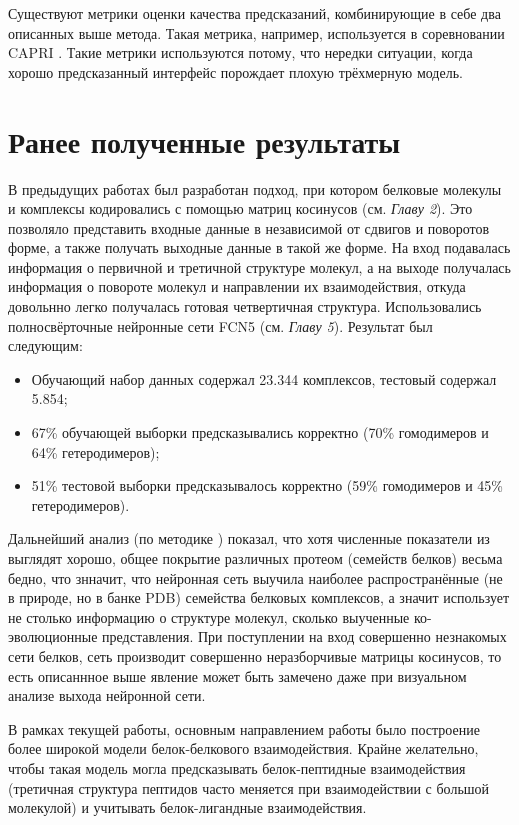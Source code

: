 Существуют метрики оценки качества предсказаний, комбинирующие в себе два описанных выше метода. Такая метрика, например, используется в соревновании CAPRI \cite{basu}. Такие метрики используются потому, что нередки ситуации, когда хорошо предсказанный интерфейс порождает плохую трёхмерную модель.

\section{Ранее полученные результаты}
В предыдущих работах \cite{prip2023} был разработан подход, при котором белковые молекулы и комплексы кодировались с помощью матриц косинусов (см. \textit{Главу 2}). Это позволяло представить входные данные в независимой от сдвигов и поворотов форме, а также получать выходные данные в такой же форме. На вход подавалась информация о первичной и третичной структуре молекул, а на выходе получалась информация о повороте молекул и направлении их взаимодействия, откуда довольнно легко получалась готовая четвертичная структура. Использовались полносвёрточные нейронные сети FCN5 (см. \textit{Главу 5}). Результат был следующим:
\begin{itemize}
\item Обучающий набор данных содержал 23.344 комплексов, тестовый содержал 5.854;
\item 67\% обучающей выборки предсказывались корректно (70\% гомодимеров и 64\% гетеродимеров);
\item 51\% тестовой выборки предсказывалось корректно (59\% гомодимеров и 45\% гетеродимеров).
\end{itemize}

Дальнейший анализ (по методике \cite{zhu}) показал, что хотя численные показатели из \cite{prip2023} выглядят хорошо, общее покрытие различных протеом (семейств белков) весьма бедно, что знначит, что нейронная сеть выучила наиболее распространённые (не в природе, но в банке PDB) семейства белковых комплексов, а значит использует не столько информацию о структуре молекул, сколько выученные ко-эволюционные представления. При поступлении на вход совершенно незнакомых сети белков, сеть производит совершенно неразборчивые матрицы косинусов, то есть описаннное выше явление может быть замечено даже при визуальном анализе выхода нейронной сети.

В рамках текущей работы, основным направлением работы было построение более широкой модели белок-белкового взаимодействия. Крайне желательно, чтобы такая модель могла предсказывать белок-пептидные взаимодействия (третичная структура пептидов часто меняется при взаимодействии с большой молекулой) и учитывать белок-лигандные взаимодействия.






